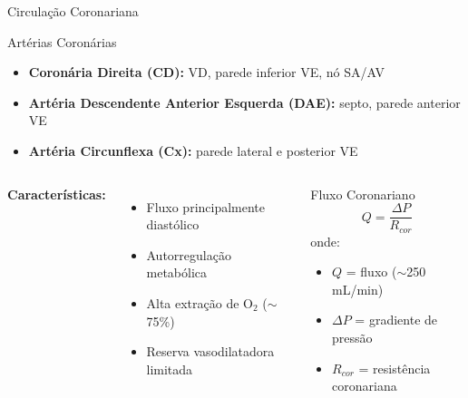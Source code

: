 \begin{frame}{Circulação Coronariana}
\begin{block}{Artérias Coronárias}
\begin{itemize}
    \item \textbf{Coronária Direita (CD):} VD, parede inferior VE, nó SA/AV
    \item \textbf{Artéria Descendente Anterior Esquerda (DAE):} septo, parede anterior VE
    \item \textbf{Artéria Circunflexa (Cx):} parede lateral e posterior VE
\end{itemize}
\end{block}

\vspace{0.3cm}

\begin{columns}
\textbf{Características:}
\begin{itemize}
    \item Fluxo principalmente diastólico
    \item Autorregulação metabólica
    \item Alta extração de O$_2$ ($\sim$75\%)
    \item Reserva vasodilatadora limitada
\end{itemize}

\begin{exampleblock}{Fluxo Coronariano}
\begin{equation*}
Q = \frac{\Delta P}{R_{cor}}
\end{equation*}
onde:
\begin{itemize}
    \item $Q$ = fluxo ($\sim$250 mL/min)
    \item $\Delta P$ = gradiente de pressão
    \item $R_{cor}$ = resistência coronariana
\end{itemize}
\end{exampleblock}
\end{columns}

\vspace{0.3cm}

\end{frame}

